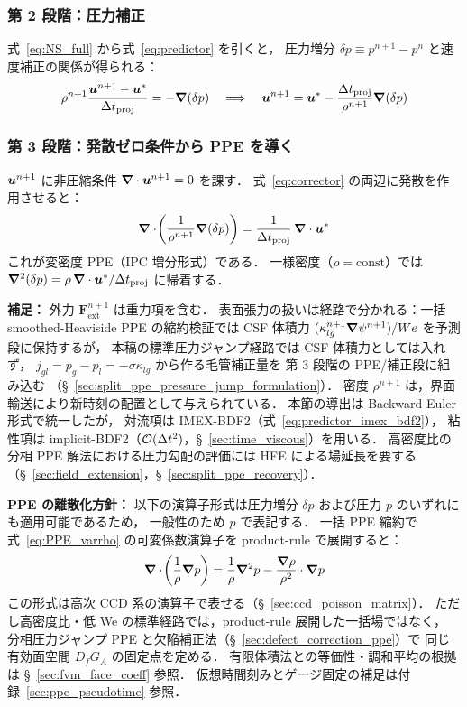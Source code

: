\subsubsection{第 2 段階：圧力補正}

式~\eqref{eq:NS_full} から式~\eqref{eq:predictor} を引くと，
圧力増分 $\delta p \equiv p^{n+1} - p^n$ と速度補正の関係が得られる：
\begin{equation}
  \rho^{n+1}\frac{\bm{u}^{n+1} - \bm{u}^*}{\Delta t_{\mathrm{proj}}} = -\bm{\nabla}(\delta p)
  \quad\Longrightarrow\quad
  \bm{u}^{n+1} = \bm{u}^* - \frac{\Delta t_{\mathrm{proj}}}{\rho^{n+1}}\bm{\nabla}(\delta p)
  \label{eq:corrector}
\end{equation}

\subsubsection{第 3 段階：発散ゼロ条件から PPE を導く}

$\bm{u}^{n+1}$ に非圧縮条件 $\bm{\nabla}\cdot\bm{u}^{n+1}=0$ を課す．
式~\eqref{eq:corrector} の両辺に発散を作用させると：
\begin{equation}
  \bm{\nabla}\cdot\!\left(\frac{1}{\rho^{n+1}}\bm{\nabla}(\delta p)\right)
  = \frac{1}{\Delta t_{\mathrm{proj}}}\,\bm{\nabla}\cdot\bm{u}^*
  \label{eq:PPE_varrho}
\end{equation}
これが変密度 PPE（IPC 増分形式）である．
一様密度（$\rho=\mathrm{const}$）では
$\bm{\nabla}^2(\delta p) = \rho\,\bm{\nabla}\cdot\bm{u}^*/\Delta t_{\mathrm{proj}}$ に帰着する．

\noindent\textbf{補足：}
外力 $\bm{F}_\text{ext}^{n+1}$ は重力項を含む．
表面張力の扱いは経路で分かれる：一括 smoothed-Heaviside PPE の縮約検証では
CSF 体積力 $(\kappa_{lg}^{n+1}\bm{\nabla}\psi^{n+1})/We$ を予測段に保持するが，
本稿の標準圧力ジャンプ経路では CSF 体積力としては入れず，
$j_{gl}=p_g-p_l=-\sigma\kappa_{lg}$ から作る毛管補正量を
第 3 段階の PPE/補正段に組み込む
（§~\ref{sec:split_ppe_pressure_jump_formulation}）．
密度 $\rho^{n+1}$ は，界面輸送により新時刻の配置として与えられている．
本節の導出は Backward Euler 形式で統一したが，
対流項は IMEX-BDF2（式~\eqref{eq:predictor_imex_bdf2}），
粘性項は implicit-BDF2（$\mathcal{O}(\Delta t^2)$，§~\ref{sec:time_viscous}）を用いる．
高密度比の分相 PPE 解法における圧力勾配の評価には
HFE による場延長を要する（§~\ref{sec:field_extension}，§~\ref{sec:split_ppe_recovery}）．

\noindent\textbf{PPE の離散化方針：}
以下の演算子形式は圧力増分 $\delta p$ および圧力 $p$ のいずれにも適用可能であるため，
一般性のため $p$ で表記する．
一括 PPE 縮約で式~\eqref{eq:PPE_varrho} の可変係数演算子を product-rule で展開すると：
\begin{equation}
  \bm{\nabla}\cdot\!\left(\frac{1}{\rho}\bm{\nabla} p\right)
  = \frac{1}{\rho}\bm{\nabla}^2 p - \frac{\bm{\nabla}\rho}{\rho^2}\cdot\bm{\nabla} p
  \label{eq:varrho_product_rule}
\end{equation}
この形式は高次 CCD 系の演算子で表せる（§~\ref{sec:ccd_poisson_matrix}）．
ただし高密度比・低 We の標準経路では，product-rule 展開した一括場ではなく，
分相圧力ジャンプ PPE と欠陥補正法（§~\ref{sec:defect_correction_ppe}）で
同じ有効面空間 $D_fG_A$ の固定点を定める．
有限体積法との等価性・調和平均の根拠は §~\ref{sec:fvm_face_coeff} 参照．
仮想時間刻みとゲージ固定の補足は付録~\ref{sec:ppe_pseudotime} 参照．

